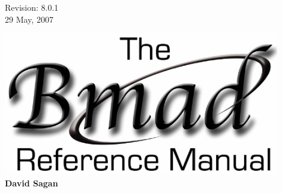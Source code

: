 \thispagestyle{empty}

\begin{flushright}
\large
  Revision: 8.0.1 \\
  29 May, 2007 \\
\end{flushright}

\vfill

{
\begin{center}
\includegraphics[width=12cm]{bmad-ref-manual.eps} \\
\vskip 0.3in
\huge\bf David Sagan
\end{center}
}

\vfill
\break

